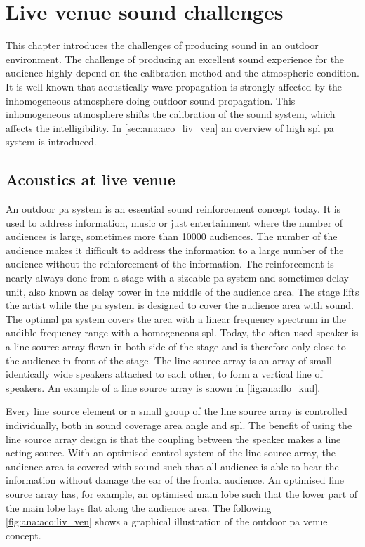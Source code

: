 \section{Live venue sound challenges}
This chapter introduces the challenges of producing sound in an outdoor environment. The challenge of producing an excellent sound experience for the audience highly depend on the calibration method and the atmospheric condition. It is well known that acoustically wave propagation is strongly affected by the inhomogeneous atmosphere doing outdoor sound propagation. This inhomogeneous atmosphere shifts the calibration of the sound system, which affects the intelligibility. In \autoref{sec:ana:aco_liv_ven} an overview of high \gls{spl} \gls{pa} system is introduced.



\subsection{Acoustics at live venue}\label{sec:ana:aco_liv_ven}
An outdoor \gls{pa} system is an essential sound reinforcement concept today. It is used to address information, music or just entertainment where the number of audiences is large, sometimes more than 10000 audiences. The number of the audience makes it difficult to address the information to a large number of the audience without the reinforcement of the information. The reinforcement is nearly always done from a stage with a sizeable \gls{pa} system and sometimes delay unit, also known as delay tower in the middle of the audience area. The stage lifts the artist while the \gls{pa} system is designed to cover the audience area with sound. The optimal \gls{pa} system covers the area with a linear frequency spectrum in the audible frequency range with a homogeneous \gls{spl}. Today, the often used speaker is a line source array flown in both side of the stage and is therefore only close to the audience in front of the stage. The line source array is an array of small identically wide speakers attached to each other, to form a vertical line of speakers. An example of a line source array is shown in \autoref{fig:ana:flo_kud}.


Every line source element or a small group of the line source array is controlled individually, both in sound coverage area angle and \gls{spl}. The benefit of using the line source array design is that the coupling between the speaker makes a line acting source. With an optimised control system of the line source array, the audience area is covered with sound such that all audience is able to hear the information without damage the ear of the frontal audience. An optimised line source array has, for example, an optimised main lobe such that the lower part of the main lobe lays flat along the audience area.
The following \autoref{fig:ana:aco:liv_ven} shows a graphical illustration of the outdoor \gls{pa} venue concept.

